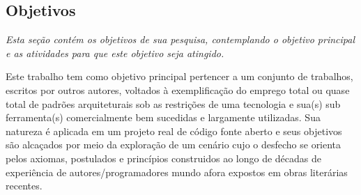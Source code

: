 

\subsection{\textbf{Objetivos}}
    \label{sec:objetivos}
    
    \textit{Esta seção contém os objetivos de sua pesquisa, contemplando o objetivo principal
    e as atividades para que este objetivo seja atingido.}

    Este trabalho tem como objetivo principal pertencer a um conjunto de trabalhos, 
    escritos por outros autores, voltados à exemplificação do emprego total ou quase
    total de padrões arquiteturais sob as restrições de uma tecnologia e sua(s) sub ferramenta(s)
    comercialmente bem sucedidas e largamente utilizadas.
      Sua natureza é aplicada em um projeto real de código fonte aberto e seus objetivos são
    alcaçados por meio da exploração de um cenário cujo o desfecho se orienta pelos axiomas,
    postulados e princípios construidos ao longo de décadas de experiência de autores/programadores
    mundo afora expostos em obras literárias recentes.
      
